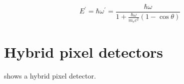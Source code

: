 \begin{equation}
E^{\prime} = \hbar\omega^{\prime} = \frac{\hbar\omega}{1+ \frac{\hbar\omega}{m_{e}c^{2}}\left(1-\cos\theta\right)}
\end{equation} 



\section{Hybrid pixel detectors}
 shows a hybrid pixel detector.
